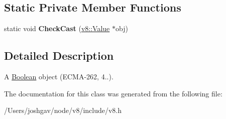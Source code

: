 \subsection*{Static Private Member Functions}
\begin{DoxyCompactItemize}
\item 
static void {\bfseries Check\+Cast} (\hyperlink{classv8_1_1_value}{v8\+::\+Value} $\ast$obj)\hypertarget{classv8_1_1_boolean_object_a733e238e5e918f3135966ee30941eee3}{}\label{classv8_1_1_boolean_object_a733e238e5e918f3135966ee30941eee3}

\end{DoxyCompactItemize}


\subsection{Detailed Description}
A \hyperlink{classv8_1_1_boolean}{Boolean} object (E\+C\+M\+A-\/262, 4..). 

The documentation for this class was generated from the following file\+:\begin{DoxyCompactItemize}
\item 
/\+Users/joshgav/node/v8/include/v8.\+h\end{DoxyCompactItemize}
